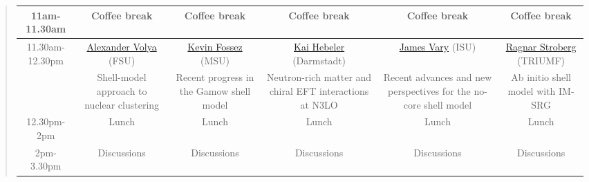 \documentclass[%
twoside,                 %
final,                   %
10pt]{article}
\begin{document}
\begin{quote}
\begin{tabular}{cccccc}
\hline
11am-11.30am    & Coffee break                                                                                              & Coffee break                                                                              & Coffee break                                                                                              & Coffee break                                                                    & Coffee break                                                                                           \\
\hline
11.30am-12.30pm & \href{{http://www.physics.fsu.edu/people/Personnel.asp?fn=Alexander&ln=Volya&mn=}}{Alexander Volya} (FSU) & \href{{http://nscl.msu.edu/directory/index.php?initial=F}}{Kevin Fossez} (MSU)            & \href{{http://theorie.ikp.physik.tu-darmstadt.de/strongint/people_hebeler.html}}{Kai Hebeler} (Darmstadt) & \href{{http://www.public.iastate.edu/~jvary/}}{James Vary} (ISU)                & \href{{http://www.triumf.ca/ragnar-stroberg}}{Ragnar Stroberg} (TRIUMF)                                \\
                & Shell-model approach to nuclear clustering                                                                & Recent progress in the Gamow shell model                                                  & Neutron-rich matter and chiral EFT interactions at N3LO                                                   & Recent advances and new perspectives for the no-core shell model                & Ab initio shell model with IM-SRG                                                                      \\
\hline
12.30pm-2pm     & Lunch                                                                                                     & Lunch                                                                                     & Lunch                                                                                                     & Lunch                                                                           & Lunch                                                                                                  \\
\hline
2pm-3.30pm      & Discussions                                                                                               & Discussions                                                                               & Discussions                                                                                               & Discussions                                                                     & Discussions                                                                                            \\

\end{tabular}
\end{quote}
\end{document}
